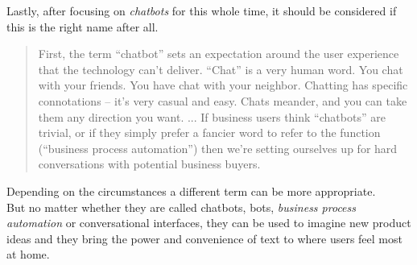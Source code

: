 Lastly, after focusing on \emph{chatbots} for this whole time,
it should be considered if this is the right name after all\cite{botnerds}.

\begin{quote}
First, the term “chatbot” sets an expectation around the user experience that the technology can’t deliver.
“Chat” is a very human word.
You chat with your friends.
You have chat with your neighbor.
Chatting has specific connotations – it’s very casual and easy.
Chats meander, and you can take them any direction you want.
...
If business users think “chatbots” are trivial, or if they simply prefer a fancier word to refer to the function (“business process automation”) then we’re setting ourselves up for hard conversations with potential business buyers.
\end{quote}

Depending on the circumstances a different term can be more appropriate.
\\

But no matter whether they are called chatbots, bots, \emph{business process automation} or conversational interfaces,
they can be used to imagine new product ideas and they bring the power and convenience of text to where users feel most at home.
